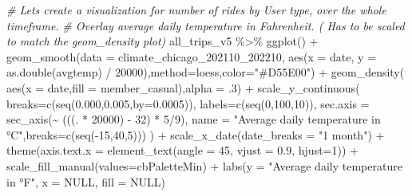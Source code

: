 \documentclass[
]{article}
\newenvironment{Shaded}{\begin{snugshade}}{\end{snugshade}}
\newcommand{\AttributeTok}[1]{\textcolor[rgb]{0.77,0.63,0.00}{#1}}
\newcommand{\CommentTok}[1]{\textcolor[rgb]{0.56,0.35,0.01}{\textit{#1}}}
\newcommand{\ConstantTok}[1]{\textcolor[rgb]{0.00,0.00,0.00}{#1}}
\newcommand{\DecValTok}[1]{\textcolor[rgb]{0.00,0.00,0.81}{#1}}
\newcommand{\FloatTok}[1]{\textcolor[rgb]{0.00,0.00,0.81}{#1}}
\newcommand{\FunctionTok}[1]{\textcolor[rgb]{0.00,0.00,0.00}{#1}}
\newcommand{\NormalTok}[1]{#1}
\newcommand{\SpecialCharTok}[1]{\textcolor[rgb]{0.00,0.00,0.00}{#1}}
\newcommand{\StringTok}[1]{\textcolor[rgb]{0.31,0.60,0.02}{#1}}
\begin{document}
\fontsize{9}{11}
\selectfont

\begin{Shaded}
\begin{Highlighting}[]
\CommentTok{\# Let\textquotesingle{}s create a visualization for number of rides by User type, over the whole timeframe. }
\CommentTok{\# Overlay average daily temperature in Fahrenheit. ( Has to be scaled to match the geom\_density plot)}
\NormalTok{all\_trips\_v5 }\SpecialCharTok{\%\textgreater{}\%} 
  \FunctionTok{ggplot}\NormalTok{() }\SpecialCharTok{+}
  \FunctionTok{geom\_smooth}\NormalTok{(}\AttributeTok{data =}\NormalTok{ climate\_chicago\_202110\_202210, }\FunctionTok{aes}\NormalTok{(}\AttributeTok{x =}\NormalTok{ date, }\AttributeTok{y =} \FunctionTok{as.double}\NormalTok{(avgtemp) }\SpecialCharTok{/} \DecValTok{20000}\NormalTok{),}\AttributeTok{method=}\NormalTok{loess,}\AttributeTok{color=}\StringTok{"\#D55E00"}\NormalTok{) }\SpecialCharTok{+}
  \FunctionTok{geom\_density}\NormalTok{( }\FunctionTok{aes}\NormalTok{(}\AttributeTok{x =}\NormalTok{ date,}\AttributeTok{fill =}\NormalTok{ member\_casual),}\AttributeTok{alpha =}\NormalTok{ .}\DecValTok{3}\NormalTok{) }\SpecialCharTok{+}
  \FunctionTok{scale\_y\_continuous}\NormalTok{(}
    \AttributeTok{breaks=}\FunctionTok{c}\NormalTok{(}\FunctionTok{seq}\NormalTok{(}\FloatTok{0.000}\NormalTok{,}\FloatTok{0.005}\NormalTok{,}\AttributeTok{by=}\FloatTok{0.0005}\NormalTok{)), }
    \AttributeTok{labels=}\FunctionTok{c}\NormalTok{(}\FunctionTok{seq}\NormalTok{(}\DecValTok{0}\NormalTok{,}\DecValTok{100}\NormalTok{,}\DecValTok{10}\NormalTok{)),}
    \AttributeTok{sec.axis =} \FunctionTok{sec\_axis}\NormalTok{(}\SpecialCharTok{\textasciitilde{}}\NormalTok{ (((. }\SpecialCharTok{*} \DecValTok{20000}\NormalTok{) }\SpecialCharTok{{-}} \DecValTok{32}\NormalTok{) }\SpecialCharTok{*} \DecValTok{5}\SpecialCharTok{/}\DecValTok{9}\NormalTok{), }\AttributeTok{name =} \StringTok{"Average daily temperature in °C"}\NormalTok{,}\AttributeTok{breaks=}\FunctionTok{c}\NormalTok{(}\FunctionTok{seq}\NormalTok{(}\SpecialCharTok{{-}}\DecValTok{15}\NormalTok{,}\DecValTok{40}\NormalTok{,}\DecValTok{5}\NormalTok{)))}
\NormalTok{    ) }\SpecialCharTok{+}
  \FunctionTok{scale\_x\_date}\NormalTok{(}\AttributeTok{date\_breaks =} \StringTok{"1 month"}\NormalTok{) }\SpecialCharTok{+}
  \FunctionTok{theme}\NormalTok{(}\AttributeTok{axis.text.x =} \FunctionTok{element\_text}\NormalTok{(}\AttributeTok{angle =} \DecValTok{45}\NormalTok{, }\AttributeTok{vjust =} \FloatTok{0.9}\NormalTok{, }\AttributeTok{hjust=}\DecValTok{1}\NormalTok{)) }\SpecialCharTok{+}
  \FunctionTok{scale\_fill\_manual}\NormalTok{(}\AttributeTok{values=}\NormalTok{cbPaletteMin) }\SpecialCharTok{+}
  \FunctionTok{labs}\NormalTok{(}\AttributeTok{y =} \StringTok{"Average daily temperature in °F"}\NormalTok{, }\AttributeTok{x =} \ConstantTok{NULL}\NormalTok{, }\AttributeTok{fill =} \ConstantTok{NULL}\NormalTok{) }
\end{Highlighting}
\end{Shaded}
\end{document}
